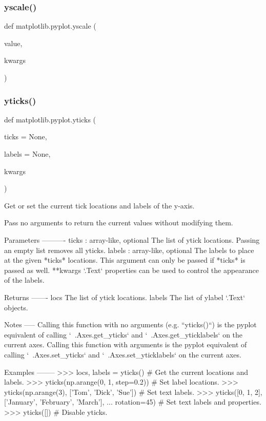 \subsubsection{\texorpdfstring{yscale()}{yscale()}}
{\footnotesize\ttfamily def matplotlib.\+pyplot.\+yscale (\begin{DoxyParamCaption}\item[{}]{value,  }\item[{}]{kwargs }\end{DoxyParamCaption})}

\mbox{\label{namespacematplotlib_1_1pyplot_a1b854edfe7256308518a62ec48a6e7f3}} 
\subsubsection{\texorpdfstring{yticks()}{yticks()}}
{\footnotesize\ttfamily def matplotlib.\+pyplot.\+yticks (\begin{DoxyParamCaption}\item[{}]{ticks = {\ttfamily None},  }\item[{}]{labels = {\ttfamily None},  }\item[{}]{kwargs }\end{DoxyParamCaption})}

\begin{DoxyVerb}Get or set the current tick locations and labels of the y-axis.

Pass no arguments to return the current values without modifying them.

Parameters
----------
ticks : array-like, optional
    The list of ytick locations.  Passing an empty list removes all yticks.
labels : array-like, optional
    The labels to place at the given *ticks* locations.  This argument can
    only be passed if *ticks* is passed as well.
**kwargs
    `.Text` properties can be used to control the appearance of the labels.

Returns
-------
locs
    The list of ytick locations.
labels
    The list of ylabel `.Text` objects.

Notes
-----
Calling this function with no arguments (e.g. ``yticks()``) is the pyplot
equivalent of calling `~.Axes.get_yticks` and `~.Axes.get_yticklabels` on
the current axes.
Calling this function with arguments is the pyplot equivalent of calling
`~.Axes.set_yticks` and `~.Axes.set_yticklabels` on the current axes.

Examples
--------
>>> locs, labels = yticks()  # Get the current locations and labels.
>>> yticks(np.arange(0, 1, step=0.2))  # Set label locations.
>>> yticks(np.arange(3), ['Tom', 'Dick', 'Sue'])  # Set text labels.
>>> yticks([0, 1, 2], ['January', 'February', 'March'],
...        rotation=45)  # Set text labels and properties.
>>> yticks([])  # Disable yticks.
\end{DoxyVerb}
 

